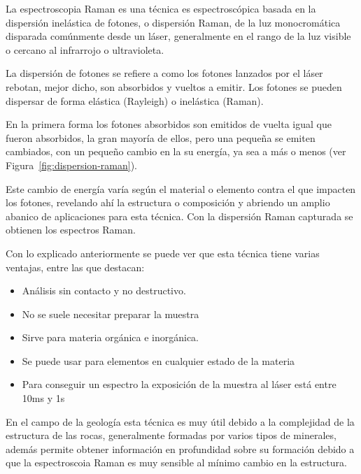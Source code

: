 
La espectroscopia Raman es una técnica es espectroscópica basada en la dispersión inelástica de fotones, o dispersión Raman, de la luz monocromática disparada comúnmente desde un láser\cite{raman-basics}, generalmente en el rango de la luz visible o cercano al infrarrojo o ultravioleta\cite{wiki:raman-en}.

La dispersión de fotones se refiere a como los fotones lanzados por el láser rebotan, mejor dicho, son absorbidos y vueltos a emitir. Los fotones se pueden dispersar de forma elástica (Rayleigh) o inelástica (Raman).

En la primera forma los fotones absorbidos son emitidos de vuelta igual que fueron absorbidos, la gran mayoría de ellos, pero una pequeña se emiten cambiados, con un pequeño cambio en la su energía, ya sea a más o menos (ver Figura~\ref{fig:dispersion-raman}).

Este cambio de energía varía según el material o elemento contra el que impacten los fotones, revelando ahí la estructura o composición y abriendo un amplio abanico de aplicaciones para esta técnica\cite{what-is-raman,wiki:raman-scatter}. Con la dispersión Raman capturada se obtienen los espectros Raman.


Con lo explicado anteriormente se puede ver que esta técnica tiene varias ventajas, entre las que destacan\cite{what-is-raman}:
\begin{itemize}
	\tightlist
	\item Análisis sin contacto y no destructivo.
	\item No se suele necesitar preparar la muestra
	\item Sirve para materia orgánica e inorgánica.
	\item Se puede usar para elementos en cualquier estado de la materia
	\item Para conseguir un espectro la exposición de la muestra al láser está entre 10ms y 1s
	
\end{itemize}

En el campo de la geología esta técnica es muy útil debido a la complejidad de la estructura de las rocas, generalmente formadas por varios tipos de minerales, además permite obtener información en profundidad sobre su formación debido a que la espectroscoia Raman es muy sensible al mínimo cambio en la estructura\cite{quora:raman-geology}.

